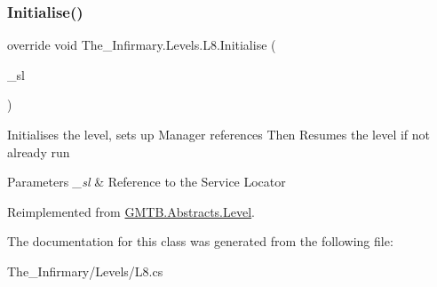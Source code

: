 \subsubsection{\texorpdfstring{Initialise()}{Initialise()}}
{\footnotesize\ttfamily override void The\+\_\+\+Infirmary.\+Levels.\+L8.\+Initialise (\begin{DoxyParamCaption}\item[{\mbox{\hyperlink{interface_g_m_t_b_1_1_interfaces_1_1_i_service_locator}{I\+Service\+Locator}}}]{\+\_\+sl }\end{DoxyParamCaption})\hspace{0.3cm}{\ttfamily [virtual]}}



Initialises the level, sets up Manager references Then Resumes the level if not already run 


\begin{DoxyParams}{Parameters}
{\em \+\_\+sl} & Reference to the Service Locator \\
\hline
\end{DoxyParams}


Reimplemented from \mbox{\hyperlink{class_g_m_t_b_1_1_abstracts_1_1_level_a0048401bb0fb66b0fb0c19b3b25e4265}{G\+M\+T\+B.\+Abstracts.\+Level}}.



The documentation for this class was generated from the following file\+:\begin{DoxyCompactItemize}
\item 
The\+\_\+\+Infirmary/\+Levels/L8.\+cs\end{DoxyCompactItemize}
